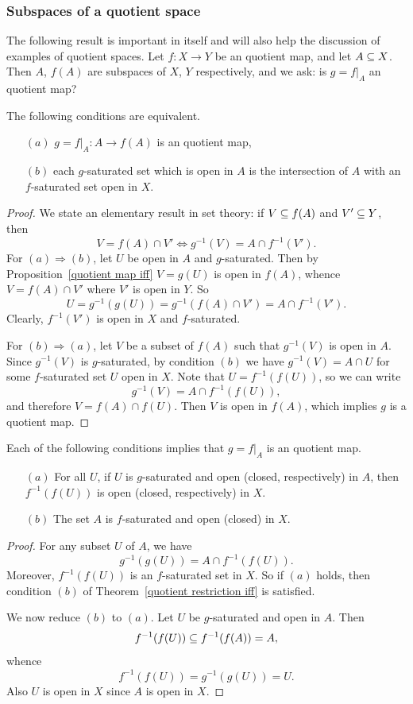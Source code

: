 \subsubsection{Subspaces of a quotient space}
The following result is important in itself and will also help the discussion of examples of quotient spaces.
Let $f:X\to Y$ be an quotient map, and let $A\subseteq X$. Then $A$, $f(A)$ are subspaces of $X$, $Y$ respectively, and we ask: is $g=f|_A$ an quotient
map?
\begin{theorem}\label{quotient restriction iff}
The following conditions are equivalent.
\begin{itemize}
\item[$(a)$] $g=f|_A:A\to f(A)$ is an quotient map,
\item[$(b)$] each $g$-saturated set which is open in $A$ is the intersection of $A$ with an $f$-saturated set open in $X$.
\end{itemize}
\end{theorem}
\begin{proof}
We state an elementary result in set theory: if $V\subseteq f(A)$ and $V'\subseteq Y$, then
\[V=f(A)\cap V'\iff g^{-1}(V)=A\cap f^{-1}(V').\]
For $(a)\Rightarrow(b)$, let $U$ be open in $A$ and $g$-saturated. Then by Proposition~\ref{quotient map iff} $V=g(U)$ is open in $f(A)$, whence $V=f(A)\cap V'$ where 
$V'$ is open in $Y$. So
\[U=g^{-1}(g(U))=g^{-1}(f(A)\cap V')=A\cap f^{-1}(V').\]
Clearly, $f^{-1}(V')$ is open in $X$ and $f$-saturated.\par
For $(b)\Rightarrow(a)$, let $V$ be a subset of $f(A)$ such that $g^{-1}(V)$ is open in $A$. Since $g^{-1}(V)$ is $g$-saturated, by condition $(b)$ we have 
$g^{-1}(V)=A\cap U$ for some $f$-saturated set $U$ open in $X$. Note that $U=f^{-1}(f(U))$, so we can write
\[g^{-1}(V)=A\cap f^{-1}(f(U)),\]
and therefore $V=f(A)\cap f(U)$. Then $V$ is open in $f(A)$, which implies $g$ is a quotient map.
\end{proof}
\begin{corollary}\label{quotient restriction on saturated open}
Each of the following conditions implies that $g=f|_A$ is an quotient map.
\begin{itemize}
\item[$(a)$] For all $U$, if $U$ is $g$-saturated and open (closed, respectively) in $A$, then $f^{-1}(f(U))$ is open (closed, respectively) in $X$.
\item[$(b)$] The set $A$ is $f$-saturated and open (closed) in $X$. 
\end{itemize}
\end{corollary}
\begin{proof}
For any subset $U$ of $A$, we have
\[g^{-1}(g(U))=A\cap f^{-1}(f(U)).\]
Moreover, $f^{-1}(f(U))$ is an $f$-saturated set in $X$. So if $(a)$ holds, then condition $(b)$ of Theorem~\ref{quotient restriction iff} is satisfied.\par
We now reduce $(b)$ to $(a)$. Let $U$ be $g$-saturated and open in $A$. Then 
\[f^{-1}(f(U))\subseteq f^{-1}(f(A))=A,\]
whence
\[f^{-1}(f(U))=g^{-1}(g(U))=U.\]
Also $U$ is open in $X$ since $A$ is open in $X$.
\end{proof}
